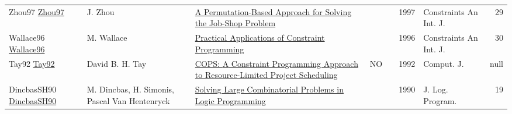 {\begin{longtable}{p{3cm}p{6cm}p{7cm}rrrp{3cm}r}
Zhou97 \href{https://doi.org/10.1023/A:1009757726572}{Zhou97} & J. Zhou & \href{articles/Zhou97.pdf}{A Permutation-Based Approach for Solving the Job-Shop Problem} &  & \cite{Zhou97} & 1997 & Constraints An Int. J. & 29\\
Wallace96 \href{https://doi.org/10.1007/BF00143881}{Wallace96} & M. Wallace & \href{articles/Wallace96.pdf}{Practical Applications of Constraint Programming} &  & \cite{Wallace96} & 1996 & Constraints An Int. J. & 30\\
Tay92 \href{}{Tay92} & David B. H. Tay & \href{articles/Tay92.pdf}{{COPS:} {A} Constraint Programming Approach to Resource-Limited Project Scheduling} & NO & \cite{Tay92} & 1992 & Comput. J. & null\\
DincbasSH90 \href{https://doi.org/10.1016/0743-1066(90)90052-7}{DincbasSH90} & M. Dincbas, H. Simonis, Pascal Van Hentenryck & \href{articles/DincbasSH90.pdf}{Solving Large Combinatorial Problems in Logic Programming} &  & \cite{DincbasSH90} & 1990 & J. Log. Program. & 19\\
\end{longtable}
}

